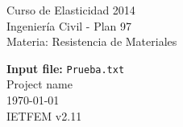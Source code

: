 \documentclass[a4paper,11pt]{article}
\begin{document}
      

\pagestyle{fancy}                            
\cfoot{}                                     


\begin{minipage}[t]{1\textwidth}      
\vspace{0.5mm}      
\noindent      
Curso de Elasticidad 2014 \\     
Ingeniería Civil - Plan 97 \\      
Materia: Resistencia de Materiales      

\begin{center}      
\textbf{\Large{ Input file:}}\Large{ \verb+Prueba.txt+}  \\      
\large{Project name \\}       
\today\\      
IETFEM v2.11      
\vspace{-2.9cm}      
\end{center}      
\end{minipage}      
\hspace{-2cm}      
\end{document}
